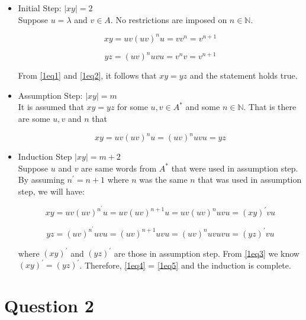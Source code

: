 \begin{itemize}

	\item
	Initial Step: $|xy| = 2$\\
	Suppose $u = \lambda$ and $v \in A$. No restrictions are imposed on $n \in \mathbb{N}$.

	\begin{equation}\label{1eq1}
	xy = uv(uv)^nu = vv^n = v^{n+1}
	\end{equation}

	\begin{equation}\label{1eq2}
	yz = (uv)^nuvu = v^nv = v^{n+1}
	\end{equation}

	From \eqref{1eq1} and \eqref{1eq2}, it follows that $xy = yz$ and the statement holds true.

	\item
	Assumption Step: $|xy| = m$\\
	It is assumed that $xy = yz$ for some $u,v \in A^*$ and some $n \in \mathbb{N}$.
	That is there are some $u, v$ and $n$ that

	\begin{equation}\label{1eq3}
	xy = uv(uv)^nu = (uv)^nuvu = yz
	\end{equation}

	\item
	Induction Step $|xy| = m + 2$\\
	Suppose $u$ and $v$ are same words from $A^*$ that were used in assumption step.
	By assuming $n^\prime = n + 1$ where $n$ was the same $n$ that was used in assumption step, we will have:

	\begin{equation}\label{1eq4}
	xy = uv(uv)^{n^\prime}u = uv(uv)^{n+1}u = uv(uv)^nuvu = (xy)^\prime vu
	\end{equation}

	\begin{equation}\label{1eq5}
	yz = (uv)^{n^\prime}uvu = (uv)^{n+1}uvu = (uv)^nuvuvu = (yz)^\prime vu
	\end{equation}

	where $(xy)^\prime$ and $(yz)^\prime$ are those in assumption step.
	From \eqref{1eq3} we know $(xy)^\prime = (yz)^\prime$. Therefore, \eqref{1eq4} = \eqref{1eq5} and the induction is complete.

\end{itemize}

\section*{Question 2}

